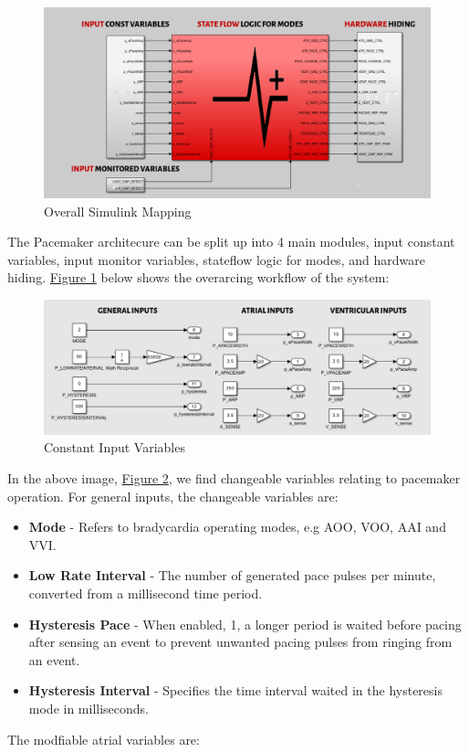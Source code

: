 \documentclass{article}
\newcounter{subsubsubsection}[subsubsection]
\begin{document}

\begin{tcolorbox}
    \begin{figure}[H]
        \includegraphics[width=\textwidth]{SimWholeView.png}
        \caption{Overall Simulink Mapping}
        \label{SimWholeView}
    \end{figure}
\end{tcolorbox}
The Pacemaker architecure can be split up into 4 main modules, input constant variables, 
input monitor variables, stateflow logic for modes, and hardware hiding. \hyperref[SimWholeView]{Figure 1} below shows the overarcing 
workflow of the system:

\newpage
{}

\begin{tcolorbox}
    \begin{figure}[H]
        \includegraphics[width=\textwidth]{ConstIn.png}
        \caption{Constant Input Variables}
        \label{ConstIn}
    \end{figure}
\end{tcolorbox}
In the above image, \hyperref[ConstIn]{Figure 2}, we find changeable variables 
relating to pacemaker operation. For general inputs, the changeable variables are:

\begin{itemize}
    \item \textbf{Mode} - Refers to bradycardia operating modes, e.g AOO, VOO, AAI and VVI.
    \item \textbf{Low Rate Interval} - The number of generated pace pulses per minute, converted from a millisecond time period. 
    \item \textbf{Hysteresis Pace} - When enabled, 1, a longer period is waited before pacing after sensing an event to prevent unwanted pacing pulses from ringing from an event. 
    \item \textbf{Hysteresis Interval} - Specifies the time interval waited in the hysteresis mode in milliseconds.
\end{itemize}
The modfiable atrial variables are:
\end{document}
